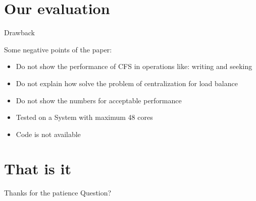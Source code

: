 \documentclass{beamer}
\begin{document}
\section{Our evaluation}

	\begin{frame}{Drawback}

	Some negative points of the paper:
	\begin{itemize}
	\item Do not show the performance of CFS in operations like: writing and seeking
	\item Do not explain how solve the problem of centralization for load balance
	\item Do not show the numbers for acceptable performance
	\item Tested on a System with maximum 48 cores
	\item Code is not available
	\end{itemize}

	\end{frame}

\section{That is it}

	\begin{frame}{}

	\begin{alertblock}{Thanks for the patience}
	Question?
	\end{alertblock}

	\end{frame}
\end{document}
